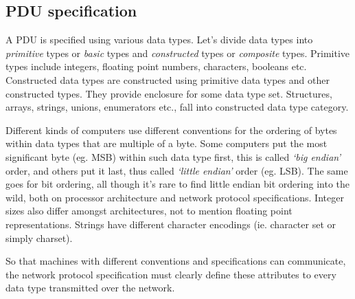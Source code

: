 \documentclass[times, utf8, diplomski]{fer}
\begin{document}
\subsection{PDU specification}
A PDU is specified using various data types. Let's divide data types into 
\emph{primitive} types or \emph{basic} types and \emph{constructed} types or 
\emph{composite} types. Primitive types include integers, floating point numbers, 
characters, booleans etc. Constructed data types are constructed using primitive 
data types and other constructed types. They provide enclosure for some data type
set. Structures, arrays, strings, unions, enumerators etc., fall into constructed 
data type category.

Different kinds of computers use different conventions for the ordering of bytes 
within data types that are multiple of a byte. Some computers put the most 
significant byte (eg. MSB) within such data type first, this is called 
\emph{`big endian'} order, and others put it last, thus called \emph{`little endian'}
order (eg. LSB). The same goes for bit ordering, all though it's rare to find 
little endian bit ordering into the wild, both on processor architecture and 
network protocol specifications. Integer sizes also differ amongst architectures, 
not to mention floating point representations. Strings have different character 
encodings (ie. character set or simply charset).

So that machines with different conventions and specifications can communicate, 
the network protocol specification must clearly define these attributes to every 
data type transmitted over the network.
\end{document}
